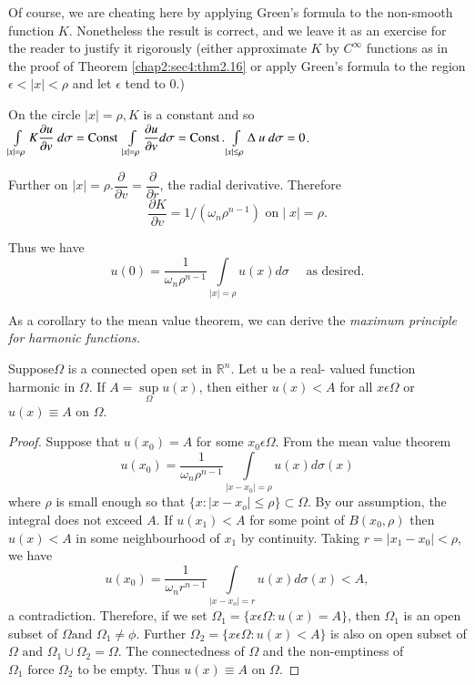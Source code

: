 Of course, we are cheating here by applying Green's formula to the
non-smooth function $K$. Nonetheless the result is correct, and we
leave it as an exercise for the reader to justify it rigorously
(either approximate $K$ by $C^\infty$ functions as in the proof of
Theorem \ref{chap2:sec4:thm2.16} or apply Green's formula to the
region $\epsilon < \mid x \mid < \rho $ and let $\epsilon$ tend to 0.) 

On the circle $\mid x \mid =\rho, K$ is a constant and so
$\int\limits_{\mid x \mid = \rho} K\dfrac{\partial u}{\partial v}~
d\sigma = \operatorname{Const}~ \int\limits_{\mid x \mid =\rho
}\dfrac{\partial u}{\partial v} d\sigma =\operatorname{Const}. 
\int\limits_{\mid x \mid \le \rho} \Delta ~u ~d\sigma =0$. 

Further on $\mid x \mid = \rho. \dfrac{\partial}{\partial v}=
\dfrac{\partial}{\partial r}$, the radial derivative. Therefore 
$$
\frac{\partial K}{\partial v} = 1/(\omega _n \rho^{n-1}) \text{ on
}\mid x \mid = \rho. 
$$

Thus we have
$$
u(0)=\frac{1}{\omega _n \rho^{n-1}} \int\limits_{\mid x \mid =\rho} u
(x) d \sigma \quad \text{ as desired}. 
$$

As a corollary to the mean value theorem, we can derive the
\textit{maximum principle for harmonic functions.} 

\setcounter{thm}{23}
\begin{thm}\label{chap2:sec4:thm2.24}%
  Suppose\pageoriginale $\Omega$ is a connected open set in
  $\mathbb{R}^n$. Let u be a real- valued function harmonic in 
  $\Omega$. If $A= \sup\limits_\Omega  u(x)$, then either
  $u(x)< A$ for all  $x \epsilon \Omega$ or  $u(x)\equiv
  A $  on  $\Omega$.   
\end{thm}

\begin{proof}%
  Suppose that $u (x_0)=A$ for some $x_0 \epsilon \Omega$. From the
  mean value theorem 
  $$
  u(x_0)=\frac{1}{\omega _n \rho^{n-1}} \int\limits_{\mid x - x_0 \mid
    = \rho} u(x) d \sigma (x) 
  $$
  where $\rho$ is small enough so that $\{x: \mid x-x_o\mid \le \rho
  \}\subset \Omega$. By our assumption, the integral does not exceed
  $A$. If $u(x_1)< A$ for some point of $B(x_0, \rho)$ then $u(x)<A$ in
  some neighbourhood of $x_1$ by continuity. Taking $r=\mid x_1-x_0 \mid
  < \rho$, we have 
  $$
  u(x_0)=\frac{1}{\omega _n r^{n-1}} \int\limits_{\mid x - x_o \mid =
    r} u(x) d \sigma (x) < A, 
  $$
  a contradiction. Therefore, if we set $\Omega_1 = \{x \epsilon \Omega
  : u (x) = A\}$, then $\Omega _1$ is an open subset of $\Omega \text{
    and } \Omega _1 \neq \phi$. Further $\Omega _2 = \{x \epsilon
  \Omega : u (x) < A\}$ is also on open subset of $\Omega \text { and }
  \Omega_1 \cup \Omega_2 =\Omega$. The connectedness of $\Omega$ and
  the non-emptiness of $\Omega_1 \text { force } \Omega _2$ to be
  empty. Thus $u(x)\equiv A $ on $\Omega$. 
\end{proof}

